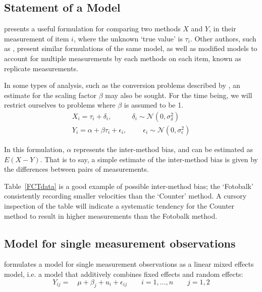 \documentclass[12pt, a4paper]{report}
\theoremstyle{plain}
\theoremstyle{definition}
\theoremstyle{remark}
\begin{document}
	
	
	\subsection{Statement of a Model}
	\citet{BXC2010} presents a useful formulation for comparing two methods $X$ and $Y$, in their measurement of item $i$, where the unknown `true value' is $\tau_i$. Other authors, such as \citet{kinsella}, present similar formulations of the same model, as well as modified models to account for multiple measurements by each methods on each item, known as replicate measurements.
	
	In some types of analysis, such as the conversion problems described by \citet{lewis}, an estimate for 
	the scaling factor $\beta$ may also be sought. For the time being, we will restrict ourselves to problems where $\beta$ is assumed to be 1. 
		\begin{eqnarray}
	X_i = \tau_i + \delta_i , \phantom{spacin} \delta_i \sim \mathcal{N}(0,\sigma^2_\delta)\\
	Y_i = \alpha + \beta \tau_i + \epsilon_i, \phantom{spaci}  \epsilon_i \sim \mathcal{N}(0,\sigma^2_\epsilon)
	\end{eqnarray}
	
	In this formulation, $\alpha$ represents the inter-method bias, and can be estimated as $E(X-Y)$. That is to say, a simple estimate of the inter-method bias is given by the differences between pairs of measurements.  
	
	Table~\ref{FCTdata} is a good example of possible inter-method bias; the `Fotobalk' consistently recording
	smaller velocities than the `Counter' method. A cursory inspection of the table will indicate a systematic tendency for the Counter method to result in higher measurements than the Fotobalk method. %
	
	

	
	\subsection{Model for single measurement observations}
	\citet{kinsella} formulates a model for
	single measurement observations as a
	linear mixed effects model, i.e. a model that additively combines
	fixed effects and random effects:
	\[
	Y_{ij} =\quad \mu + \beta_{j} + u_{i} + \epsilon_{ij} \qquad i = 1,\dots,n
	\qquad j=1,2\]
	
\end{document}
